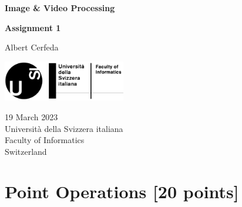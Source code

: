 \documentclass[tikz,14pt,fleqn]{article}
\newcommand\namesurname{Albert Cerfeda}
\newcommand\assignment{Assignment 1}
\newcommand\subject{Image \& Video Processing}
\newcommand\documentdate{19 March 2023}
\begin{document}
\begin{titlepage}
   \begin{center}
       \vspace*{0.2cm}

       \textbf{\Large{\subject}}

       \vspace{0.5cm}
        \textbf{\assignment}\\[5mm]
        
            
       \vspace{0.4cm}

        \namesurname
        \begin{figure}[H]
            \centering
        \end{figure}
       \tableofcontents

       \vspace*{\fill}
     
        \includegraphics[width=0.4\textwidth]{fig/logo.png}
       
        \documentdate \\
        Università della Svizzera italiana\\
        Faculty of Informatics\\
        Switzerland\\

   \end{center}
\end{titlepage}

\section{Point Operations [20 points]}
\end{document}
